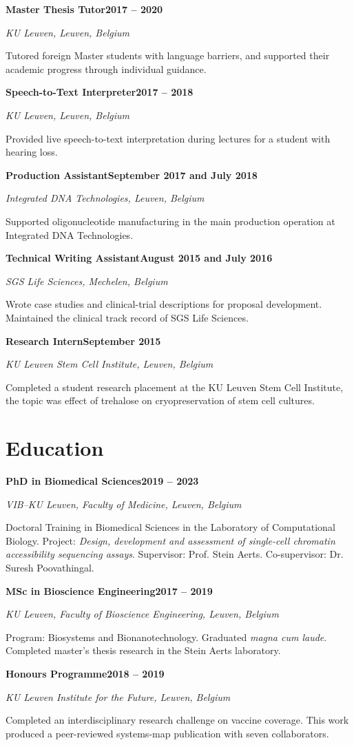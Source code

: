 \documentclass[10pt]{scrartcl}
\newcommand{\cventry}[4]{%
    \needspace{5\baselineskip}%
    {\large\textbf{#1}}\hfill\textbf{#3}\par
    \textit{#2}\par
    \smallskip
    #4\par
    \medskip
}
\begin{document}
\cventry
    {Master Thesis Tutor}
    {KU Leuven, Leuven, Belgium}
    {2017 -- 2020}
    {Tutored foreign Master students with language barriers, and supported their academic progress through individual guidance.}

\cventry
    {Speech-to-Text Interpreter}
    {KU Leuven, Leuven, Belgium}
    {2017 -- 2018}
    {Provided live speech-to-text interpretation during lectures for a student with hearing loss.}

\cventry
    {Production Assistant}
    {Integrated DNA Technologies, Leuven, Belgium}
    {September 2017 and July 2018}
    {Supported oligonucleotide manufacturing in the main production operation at Integrated DNA Technologies.}

\cventry
    {Technical Writing Assistant}
    {SGS Life Sciences, Mechelen, Belgium}
    {August 2015 and July 2016}
    {Wrote case studies and clinical-trial descriptions for proposal development. Maintained the clinical track record of SGS Life Sciences.}

\cventry
    {Research Intern}
    {KU Leuven Stem Cell Institute, Leuven, Belgium}
    {September 2015}
    {Completed a student research placement at the KU Leuven Stem Cell Institute, the topic was effect of trehalose on cryopreservation of stem cell cultures.}

\section{Education}

\cventry
    {PhD in Biomedical Sciences}
    {VIB--KU Leuven, Faculty of Medicine, Leuven, Belgium}
    {2019 -- 2023}
    {Doctoral Training in Biomedical Sciences in the Laboratory of Computational Biology. Project: \emph{Design, development and assessment of single-cell chromatin accessibility sequencing assays}. Supervisor: Prof. Stein Aerts. Co-supervisor: Dr. Suresh Poovathingal.}

\cventry
    {MSc in Bioscience Engineering}
    {KU Leuven, Faculty of Bioscience Engineering, Leuven, Belgium}
    {2017 -- 2019}
    {Program: Biosystems and Bionanotechnology. Graduated \emph{magna cum laude}. Completed master's thesis research in the Stein Aerts laboratory.}

\cventry
    {Honours Programme}
    {KU Leuven Institute for the Future, Leuven, Belgium}
    {2018 -- 2019}
    {Completed an interdisciplinary research challenge on vaccine coverage. This work produced a peer-reviewed systems-map publication with seven collaborators.}
\end{document}
